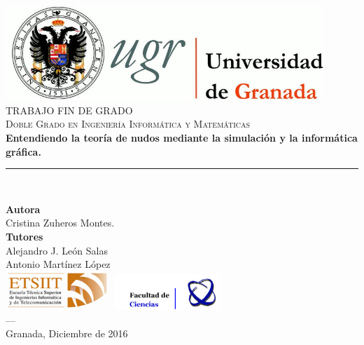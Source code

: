 \begin{titlepage}
 
 
\newlength{\centeroffset}
\setlength{\centeroffset}{-0.5\oddsidemargin}
\addtolength{\centeroffset}{0.5\evensidemargin}
\thispagestyle{empty}

\noindent\hspace*{\centeroffset}\begin{minipage}{\textwidth}

\centering
\includegraphics[width=0.9\textwidth]{img/logo_ugr.jpg}\\[1.4cm]

\textsc{ \Large TRABAJO FIN DE GRADO\\[0.2cm]}
\textsc{ Doble Grado en Ingeniería Informática y Matemáticas}\\[1cm]
% 
{\LARGE\bfseries Entendiendo la teoría de nudos mediante la simulación y la informática gráfica. 
\\
}
\noindent\rule[-1ex]{\textwidth}{3pt}\\[3.5ex]
\end{minipage}

\vspace{2.5cm}
\noindent\hspace*{\centeroffset}\begin{minipage}{\textwidth}
\centering

\textbf{Autora}\\ {Cristina Zuheros Montes.}\\[2.5ex]
\textbf{Tutores}\\
{Alejandro J. León Salas}\\
{Antonio Martínez López}\\[2cm]
\includegraphics[width=0.3\textwidth]{img/logo_etsiit.png} \hfill \includegraphics[width=0.3\textwidth]{img/logo_ciencias.jpg}\\[0.1cm]
\textsc{---}\\
Granada, Diciembre de 2016
\end{minipage}
\end{titlepage}